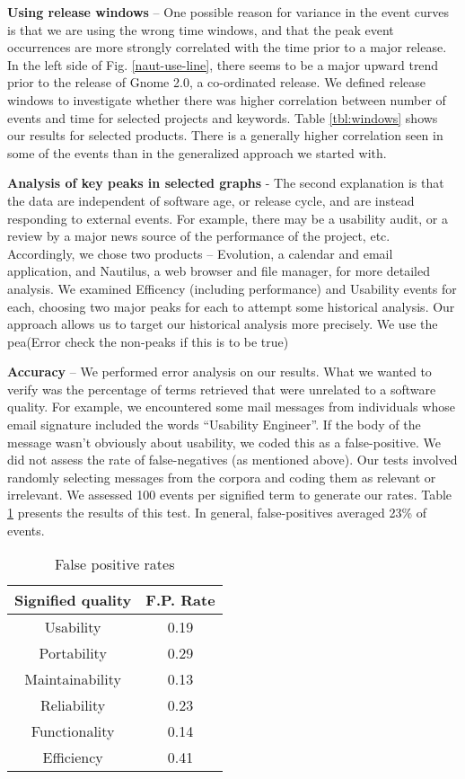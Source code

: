 \documentclass[conference, compsoc]{IEEEtran}
\begin{document}
\noindent\textbf{Using release windows} -- One possible reason for variance in the event curves is that we are using the wrong time windows, and that the peak event occurrences are more strongly correlated with the time prior to a major release. In the left side of Fig. \ref{naut-use-line}, there seems to be a major upward trend prior to the release of Gnome 2.0, a co-ordinated release. We defined release windows to investigate whether there was higher correlation between number of events and time for selected projects and keywords. Table \ref{tbl:windows} shows our results for selected products. There is a generally higher correlation seen in some of the events than in the generalized approach we started with. 

\noindent\textbf{Analysis of key peaks in selected graphs} - The second explanation is that the data are independent of software age, or release cycle, and are instead responding to external events. For example, there may be a usability audit, or a review by a major news source of the performance of the project, etc. Accordingly, we chose two products -- Evolution, a calendar and email application, and Nautilus, a web browser and file manager, for more detailed analysis. We examined Efficency (including performance) and Usability events for each, choosing two major peaks for each to attempt some historical analysis. Our approach allows us to target our historical analysis more precisely. We use the pea(Error check the non-peaks if this is to be true)

\noindent\textbf{Accuracy} -- We performed error analysis on our results. What we wanted to verify was the percentage of terms retrieved that were unrelated to a software quality. For example, we encountered some mail messages from individuals whose email signature included the words ``Usability Engineer''. If the body of the message wasn't obviously about usability, we coded this as a false-positive. We did not assess the rate of false-negatives (as mentioned above). Our tests involved randomly selecting messages from the corpora and coding them as relevant or irrelevant. We assessed 100 events per signified term to generate our rates. Table \ref{tbl:error} presents the results of this test. In general, false-positives averaged 23\% of events.

\begin{table}
	\caption{False positive rates}
	\centering
	\label{tbl:error}
\begin{tabular}{|c|c|}
\hline
Signified quality & F.P. Rate  \\
\hline
\hline
Usability & 0.19\\ \hline
Portability & 0.29\\ \hline
Maintainability & 0.13\\ \hline
Reliability & 0.23\\ \hline
Functionality & 0.14 \\ \hline
Efficiency & 0.41\\ \hline
\hline
\end{tabular}
\end{table}
\end{document}
